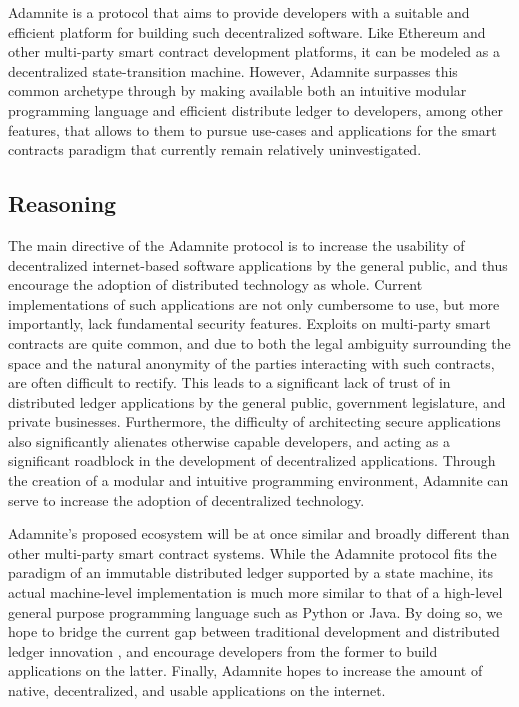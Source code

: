 \documentclass[conference]{IEEEtran}
\begin{document}
Adamnite is a protocol that aims to provide developers with a suitable and efficient platform for building such decentralized software. Like Ethereum and other multi-party smart contract development platforms, it can be modeled as a decentralized state-transition machine. However, Adamnite surpasses this common archetype through by making available both an intuitive modular programming language and efficient distribute ledger to developers, among other features, that allows to them to pursue use-cases and applications for the smart contracts paradigm that currently remain relatively uninvestigated.

\subsection{Reasoning}

The main directive of the Adamnite protocol is to increase the usability of decentralized internet-based software applications by the general public, and thus encourage the adoption of distributed technology as whole. Current implementations of such applications are not only cumbersome to use, but more importantly, lack fundamental security features. Exploits on multi-party smart contracts are quite common, and due to both the legal ambiguity surrounding the space and the natural anonymity of the parties interacting with such contracts, are often difficult to rectify. This leads to a significant lack of trust of in distributed ledger applications by the general public, government legislature, and private businesses. Furthermore, the difficulty of architecting secure applications also significantly alienates  otherwise capable developers, and acting as a significant roadblock in the development of decentralized applications. Through the creation of a modular and intuitive programming environment, Adamnite can serve to increase the adoption of decentralized technology.

Adamnite's proposed ecosystem will be at once similar and broadly different than other multi-party smart contract systems. While the Adamnite protocol fits the paradigm of an immutable distributed ledger supported by a state machine, its actual machine-level implementation is much more similar to that of a high-level general purpose programming language such as Python or Java. By doing so, we hope to bridge the current gap between traditional development and distributed ledger innovation , and encourage developers from the former to build applications on the latter. Finally, Adamnite hopes to increase the amount of native, decentralized, and usable applications on the internet.
\end{document}
